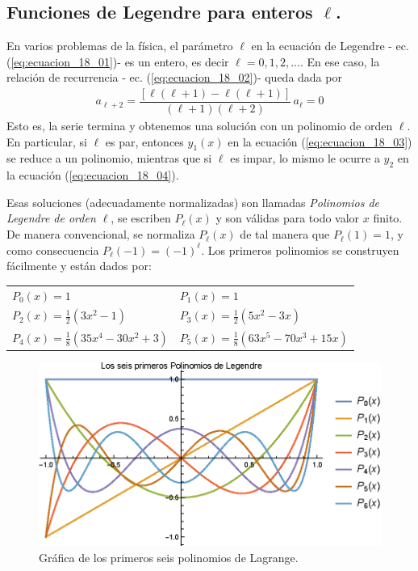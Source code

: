 \subsection{Funciones de Legendre para enteros \texorpdfstring{$\ell$}{l}.}
En varios problemas de la física, el parámetro $\ell$ en la ecuación de Legendre - ec. (\ref{eq:ecuacion_18_01})- es un entero, es decir $\ell = 0,1,2,\ldots$. En ese caso, la relación de recurrencia - ec. (\ref{eq:ecuacion_18_02})- queda dada por
\begin{align*}
a_{\ell + 2} = \dfrac{[ \ell (\ell + 1) - \ell (\ell + 1) ]}{(\ell + 1)(\ell + 2)} \, a_{\ell} = 0
\end{align*}
Esto es, la serie termina y obtenemos una solución con un polinomio de orden $\ell$. En particular, si $\ell$ es par, entonces $y_{1}(x)$ en la ecuación (\ref{eq:ecuacion_18_03}) se reduce a un polinomio, mientras que si $\ell$ es impar, lo mismo le ocurre a $y_{2}$ en la ecuación (\ref{eq:ecuacion_18_04}).
\par
Esas soluciones (adecuadamente normalizadas) son llamadas \emph{Polinomios de Legendre de orden $\ell$}, se escriben $P_{\ell}(x)$ y son válidas para todo valor $x$ finito. De manera convencional, se normaliza $P_{\ell}(x)$ de tal manera que $P_{\ell}(1) =  1$, y como consecuencia $P_{\ell}(-1) = (-1)^{\ell}$. Los primeros polinomios se construyen fácilmente y están dados por:
\begin{center}
\begin{tabular}{l l}
$P_{0}(x) = 1 $ & $P_{1}(x) = 1 $ \\[0.5em]
$P_{2}(x) = \frac{1}{2} (3 x^{2} - 1)$ & $P_{3}(x) = \frac{1}{2} (5 x^{2} - 3 x)$ \\[0.5em] 
$P_{4}(x) = \frac{1}{8} (35 x^{4} - 30 x^{2} + 3)$ & $P_{5}(x) = \frac{1}{8} (63 x^{5} - 70 x^{3} + 15 x)$
\end{tabular}
\end{center}
\begin{figure}[H]
    \centering
    \includegraphics[scale=1]{Imagenes/Plot_Lagrange_0-6.eps}
    \caption{Gráfica de los primeros seis polinomios de Lagrange.}
    \label{fig:polinomios_Lagrange_01}
\end{figure}
